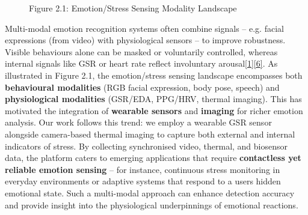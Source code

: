 \documentclass[12pt,a4paper]{article}
\begin{document}
\begin{figure}
\centering
{}
\caption{Figure 2.1: Emotion/Stress Sensing Modality Landscape}
\end{figure}

Multi-modal emotion recognition systems often combine signals -- e.g. facial expressions (from video) with physiological sensors -- to improve robustness. Visible behaviours alone can be masked or voluntarily controlled, whereas internal signals like GSR or heart rate reflect involuntary arousal\href{https://www.mdpi.com/2076-3417/10/8/2924\#:~:text=primarily\%20use\%20visual\%20information\%20for,it\%20might\%20be\%20possible\%20to}{{[}1{]}}\href{https://www.mdpi.com/2076-3417/10/8/2924\#:~:text=expression\%20is\%20inherently\%20a\%20voluntary,outline\%20the\%20advantages\%20and\%20the}{{[}6{]}}. As illustrated in Figure 2.1, the emotion/stress sensing landscape encompasses both \textbf{behavioural modalities} (RGB facial expression, body pose, speech) and \textbf{physiological modalities} (GSR/EDA, PPG/HRV, thermal imaging). This has motivated the integration of \textbf{wearable sensors} and \textbf{imaging} for richer emotion analysis. Our work follows this trend: we employ a wearable GSR sensor alongside camera-based thermal imaging to capture both external and internal indicators of stress. By collecting synchronised video, thermal, and biosensor data, the platform caters to emerging applications that require \textbf{contactless yet reliable emotion sensing} -- for instance, continuous stress monitoring in everyday environments or adaptive systems that respond to a user\textquotesingle s hidden emotional state. Such a multi-modal approach can enhance detection accuracy and provide insight into the physiological underpinnings of emotional reactions.
\end{document}
